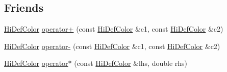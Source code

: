 \subsection*{Friends}
\begin{DoxyCompactItemize}
\item 
\hyperlink{class_hi_def_color}{Hi\-Def\-Color} \hyperlink{class_hi_def_color_acb6d7c39f2e4766080ba115fd16807f3}{operator+} (const \hyperlink{class_hi_def_color}{Hi\-Def\-Color} \&c1, const \hyperlink{class_hi_def_color}{Hi\-Def\-Color} \&c2)
\item 
\hyperlink{class_hi_def_color}{Hi\-Def\-Color} \hyperlink{class_hi_def_color_af03c6dfd98fdb24c983d536686bcc065}{operator-\/} (const \hyperlink{class_hi_def_color}{Hi\-Def\-Color} \&c1, const \hyperlink{class_hi_def_color}{Hi\-Def\-Color} \&c2)
\item 
\hyperlink{class_hi_def_color}{Hi\-Def\-Color} \hyperlink{class_hi_def_color_adce5dfbc8cc2a59c44996cc050a2609e}{operator$\ast$} (const \hyperlink{class_hi_def_color}{Hi\-Def\-Color} \&lhs, double rhs)
\end{DoxyCompactItemize}


